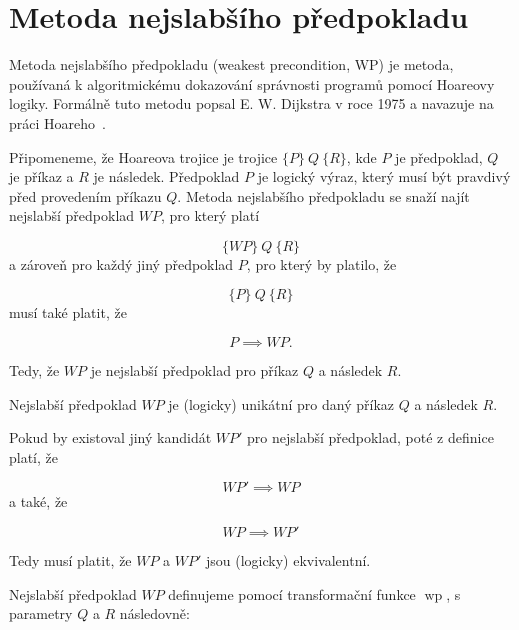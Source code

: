 \chapter{Metoda nejslabšího předpokladu}
\label{ch:metoda-nejslabsiho-predpokladu}

Metoda nejslabšího předpokladu (weakest precondition, WP) je metoda,
používaná k algoritmickému dokazování správnosti programů pomocí Hoareovy logiky.
Formálně tuto metodu popsal E. W. Dijkstra v roce 1975 a navazuje na práci Hoareho~\cite{Dijkstra1975}.

Připomeneme, že Hoareova trojice je trojice $ \{ P \} \ Q \ \{ R \} $,
kde $P$ je předpoklad, $Q$ je příkaz a $R$ je následek.
Předpoklad $P$ je logický výraz, který musí být pravdivý před provedením příkazu $Q$.
Metoda nejslabšího předpokladu se snaží najít nejslabší předpoklad $WP$, pro který platí

\begin{equation*}
    \{ WP \} \ Q \ \{ R \}
\end{equation*}
a zároveň pro každý jiný předpoklad $P$, pro který by platilo, že

\begin{equation*}
    \{ P \} \ Q \ \{ R \}
\end{equation*}
musí také platit, že

\begin{equation*}
    P \implies WP.
\end{equation*}

Tedy, že $WP$ je nejslabší předpoklad pro příkaz $Q$ a následek $R$.

\begin{remark}
    Nejslabší předpoklad $WP$ je (logicky) unikátní pro daný příkaz $Q$ a následek $R$.
\end{remark}

Pokud by existoval jiný kandidát $WP'$ pro nejslabší předpoklad,
poté z definice platí, že

\begin{equation*}
    WP' \implies WP
\end{equation*}
a také, že

\begin{equation*}
    WP \implies WP'
\end{equation*}

Tedy musí platit, že $WP$ a $WP'$ jsou (logicky) ekvivalentní.

Nejslabší předpoklad $WP$ definujeme pomocí transformační funkce $\operatorname{wp}$,
s parametry $Q$ a $R$ následovně:

